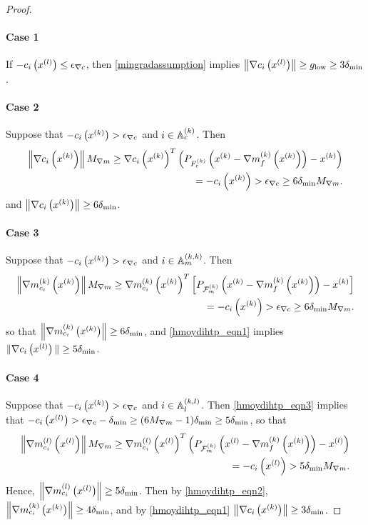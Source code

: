 \begin{proof}
\paragraph{Case 1}
If $-c_i\left({x^{(l)}}\right) \le {\epsilon_{\nabla c}}$, then \cref{mingradassumption} implies $\left\| \nabla c_i\left({x^{(l)}}\right) \right\| \ge { g_{\textrm{low}} } \ge 3 {\delta_{\textrm{min}}}$.

\paragraph{Case 2}
Suppose that $-c_i\left(x^{(k)}\right) > {\epsilon_{\nabla c}}$ and $i \in {\mathbb A_c^{(k)}}$.
Then
\begin{align*}
\left\|\nabla c_i\left(x^{(k)}\right)  \right\| {M_{\nabla m}}
\ge \nabla c_i\left(x^{(k)}\right) ^T\left(P_{{F_c^{(k)}}}\left(x^{(k)} - {\nabla m_f^{(k)}\left(x^{(k)}\right)}\right) - x^{(k)}\right) \\
= -c_i\left(x^{(k)}\right) > {\epsilon_{\nabla c}} \ge 6 {\delta_{\textrm{min}}} {M_{\nabla m}}.
\end{align*}
and $\left\|\nabla c_i\left(x^{(k)}\right)  \right\| \ge 6 {\delta_{\textrm{min}}}$.


\paragraph{Case 3}
Suppose that $-c_i\left(x^{(k)}\right) > {\epsilon_{\nabla c}}$ and $i \in {\mathbb A_m^{(k, k)}}$.
Then
\begin{align*}
\left\|{\nabla m_{c_i}^{(k)}\left(x^{(k)}\right)}\right\| {M_{\nabla m}}
\ge {\nabla m_{c_i}^{(k)}\left(x^{(k)}\right)}^T\left[P_{{\mathcal F_m^{(k)}}}\left(x^{(k)} - {\nabla m_f^{(k)}\left(x^{(k)}\right)}\right) - x^{(k)}\right] \\
= -c_i\left(x^{(k)}\right) > {\epsilon_{\nabla c}} \ge 6 {\delta_{\textrm{min}}} {M_{\nabla m}}.
\end{align*}
so that $\left\|{\nabla m_{c_i}^{(k)}\left(x^{(k)}\right)}\right\| \ge 6 {\delta_{\textrm{min}}}$, and \cref{hmoydihtp_eqn1} implies $\| \nabla c_i\left({x^{(l)}}\right) \| \ge 5 {\delta_{\textrm{min}}}$.

\paragraph{Case 4}
Suppose that $-c_i\left(x^{(k)}\right) > {\epsilon_{\nabla c}}$ and $i \in {\mathbb A_l^{(k, l)}}$.
Then \cref{hmoydihtp_eqn3} implies that $-c_i\left({x^{(l)}}\right) > {\epsilon_{\nabla c}} - {\delta_{\textrm{min}}} \ge (6{M_{\nabla m}} - 1) {\delta_{\textrm{min}}} \ge 5 {\delta_{\textrm{min}}}$, so that
\begin{align*}
\left\|{\nabla m_{c_i}^{(l)}\left({x^{(l)}}\right)}\right\| {M_{\nabla m}}
\ge {\nabla m_{c_i}^{(l)}\left({x^{(l)}}\right)}^T\left(P_{{\mathcal F_m^{(k)}}}\left({x^{(l)}} - {\nabla m_f^{(k)}\left(x^{(k)}\right)}\right) - {x^{(l)}}\right) \\
= -c_i\left({x^{(l)}}\right) > 5 {\delta_{\textrm{min}}} {M_{\nabla m}}.
\end{align*}
Hence, $\left\|{\nabla m_{c_i}^{(l)}\left({x^{(l)}}\right)}\right\| \ge 5 {\delta_{\textrm{min}}}$.
Then by \cref{hmoydihtp_eqn2}, $\left\|{\nabla m_{c_i}^{(k)}\left(x^{(k)}\right)}\right\| \ge 4 {\delta_{\textrm{min}}}$, and by \cref{hmoydihtp_eqn1} $\left\|\nabla c_i\left(x^{(k)}\right) \right\| \ge 3 {\delta_{\textrm{min}}}$.



\end{proof}
